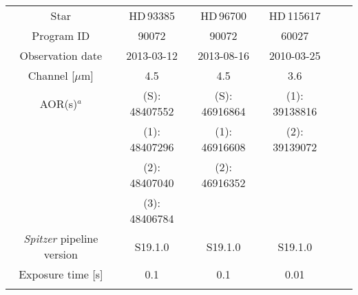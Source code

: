 \documentclass[traditabstract]{aa}
\begin{document}
\begin{appendix}
\begin{table*}
\begin{center}
{\scriptsize
\label{tab:targets}
\begin{tabular}{cccccc}
\hline\noalign {\smallskip}
Star &  HD\,93385 & HD\,96700 & HD\,115617      \\ \noalign {\smallskip}
\hline \noalign {\smallskip}  
Program ID                                                          & 90072                                & 90072                          &  60027                      \\ \noalign {\smallskip} 
Observation date                                                 & 2013-03-12                       & 2013-08-16                 &  2010-03-25                \\ \noalign {\smallskip} 
Channel       [$\mu$m]                                         & 4.5                                    & 4.5                              & 3.6                              \\ \noalign {\smallskip} 
AOR(s)$^a$                                                        & (S): 48407552                   & (S): 46916864            & (1): 39138816            \\ \noalign {\smallskip}                                                                                      
                                                                           & (1): 48407296                   &  (1): 46916608              & (2): 39139072             \\ \noalign {\smallskip} 
                                                                           & (2):  48407040                    & (2): 46916352            &                                    \\ \noalign {\smallskip} 
                                                                           & (3): 48406784                    &                                     &                                        \\ \noalign {\smallskip}                                                                
{\it Spitzer} pipeline version                               & S19.1.0                                 & S19.1.0                       & S19.1.0                         \\ \noalign {\smallskip}     
Exposure time [s]                                               & 0.1                                       & 0.1                               & 0.01                               \\ \noalign {\smallskip} 

\end{tabular}}
\end{center}
\end{table*}
\end{appendix}
\end{document}
